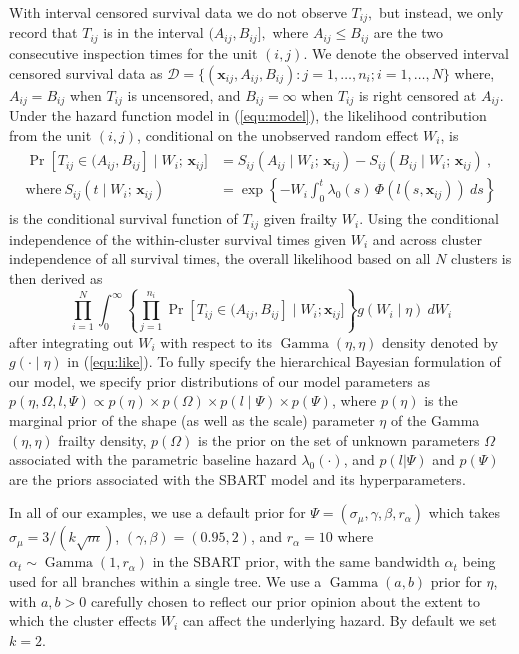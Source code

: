 \documentclass[11pt]{article}
\newcommand{\Gam}{\operatorname{Gamma}}
\begin{document}
 With interval censored survival data we do not observe $T_{ij},$ but instead, we only record that $T_{ij}$ is in the interval $(A_{ij}, B_{ij}],$ where $A_{ij} \leq B_{ij}$ are the two consecutive inspection times for the unit $(i,j)$. We denote the observed interval censored survival data as  $\mathcal{D} = \{(\mathbf{x}_{ij}, A_{ij}, B_{ij}): j=1, \dots, n_i; i=1, \dots, N\}$ where,  $A_{ij}=B_{ij}$ when  $T_{ij}$ is uncensored, and $B_{ij} = \infty$ when $T_{ij}$ is right censored at $A_{ij}$. Under the hazard function model in (\ref{equ:model}), the likelihood contribution from the unit $(i,j)$, conditional on the unobserved random effect $W_i$, is 
 \begin{align}
 \begin{split}
	\Pr[T_{ij} \in (A_{ij}, B_{ij}] \mid W_i ; \, \mathbf{x}_{ij}] &= S_{ij}(A_{ij}\mid W_i; \, \mathbf{x}_{ij}) - S_{ij}(B_{ij}\mid W_i; \, \mathbf{x}_{ij})\ , 
	\\ \text{where}\ S_{ij}(t\mid W_i; \, \mathbf{x}_{ij}) & 
	=
	\exp\left\{-W_i \int_0^t \lambda_0(s) \, \Phi(l(s,\mathbf{x}_{ij})) \ ds\right\}
	\label{eq:survival}
 \end{split}
\end{align}
is the conditional survival function of $T_{ij}$ given frailty $W_i$. Using the conditional independence of the within-cluster survival times given $W_i$ and across cluster
independence of all survival times, the overall likelihood 
based on all $N$ clusters is then derived as 
 \begin{equation}
  \prod_{i=1}^{N}\int_{0}^{\infty}\left\{\prod_{j=1}^{n_i}	\Pr[T_{ij} \in (A_{ij}, B_{ij}]\mid  W_i;\mathbf{x}_{ij}]
  \right\} g(W_i\mid \eta) \ dW_i 
  \label{equ:like}
\end{equation}
 after integrating out $W_i$ with respect to its $\Gam(\eta,\eta)$ density denoted by  $g(\cdot\mid \eta)$ in (\ref{equ:like}). To fully specify the hierarchical Bayesian formulation of our model, we specify prior distributions of our model parameters as $p(\eta,\Omega, l,\Psi)\propto p(\eta)\times p(\Omega)\times p(l\mid \Psi)\times p(\Psi)$, where $p(\eta)$ is the marginal prior of the shape (as well as the scale) parameter $\eta$ of the Gamma$(\eta,\eta)$ frailty density, $p({\Omega})$ is the prior on the set of unknown parameters ${\Omega}$ associated with the parametric baseline hazard $\lambda_0(\cdot)$, and $p(l|\Psi)$ and $p(\Psi)$ are the priors associated with the SBART model and its hyperparameters. 
 
 In all of our examples, we use a default prior for $\Psi = (\sigma_\mu, \gamma, \beta, r_\alpha)$ which takes $\sigma_\mu = 3 / (k\sqrt m)$,  $(\gamma, \beta) = (0.95, 2)$, and $r_\alpha = 10$ where $\alpha_t \sim \Gam(1,r_\alpha)$ in the SBART prior, with the same bandwidth $\alpha_t$ being used for all branches within a single tree. We use a $\Gam(a,b)$ prior for $\eta$, with $a,b > 0$ carefully chosen to reflect our prior opinion about the extent to which the cluster effects $W_i$ can affect the underlying hazard. By default we set $k = 2$.
 
\end{document}
